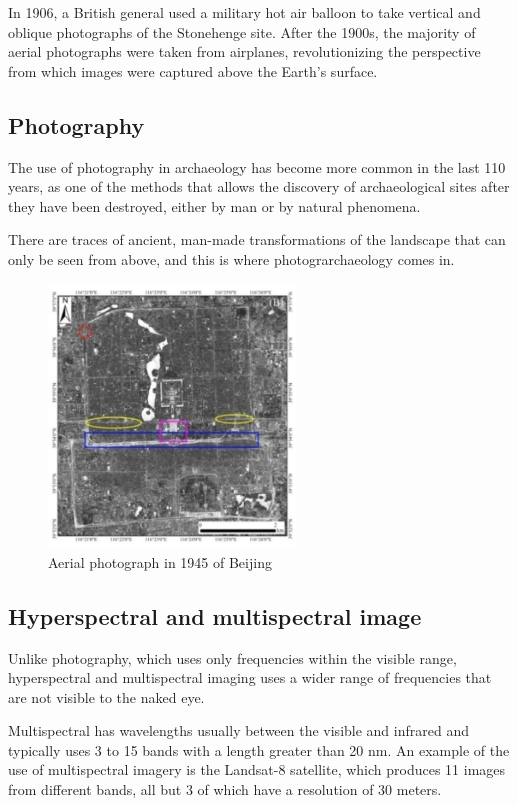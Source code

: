 In 1906, a British general used a military hot air balloon to take vertical and oblique photographs of the Stonehenge site. After the 1900s, the majority of aerial photographs were taken from airplanes, revolutionizing the perspective from which images were captured above the Earth's surface.


\subsection{Photography}
The use of photography in archaeology has become more common in the last 110 years\cite{asmr}, as one of the methods that allows the discovery of archaeological sites after they have been destroyed, either by man or by natural phenomena. 

There are traces of ancient, man-made transformations of the landscape that can only be seen from above, and this is where photograrchaeology comes in.

\begin{figure}[h]
\centering
\includegraphics[height=7cm]{images/foto.png}
\caption{Aerial photograph in 1945 of Beijing \cite{asmr}}
\end{figure}

\subsection{Hyperspectral and multispectral image}
Unlike photography, which uses only frequencies within the visible range, hyperspectral and multispectral imaging uses a wider range of frequencies that are not visible to the naked eye.


Multispectral has wavelengths usually between the visible and infrared and typically uses 3 to 15 bands with a length greater than 20 nm. An example of the use of multispectral imagery is the Landsat-8 satellite, which produces 11 images from different bands, all but 3 of which have a resolution of 30 meters.


